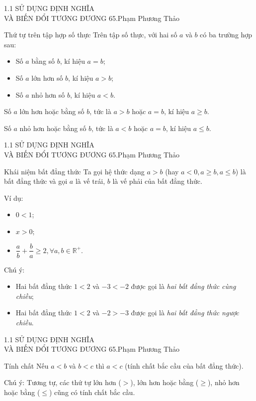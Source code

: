 \begin{frame}{
1.1 SỬ DỤNG ĐỊNH NGHĨA \\ VÀ BIẾN ĐỔI TƯƠNG ĐƯƠNG \hspace{3cm}  65.Phạm Phương Thảo} 
\begin{block}{Thứ tự trên tập hợp số thực}
\pause
Trên tập số thực, với hai số $a$ và $b$ có ba trường hợp sau:

\begin{itemize}
    \item Số $a$ bằng số $b$, kí hiệu $a=b$;
    \item Số $a$ lớn hơn số $b$, kí hiệu $a>b$;
    \item Số $a$ nhỏ hơn số $b$, kí hiệu $a<b$.
\end{itemize}
\end{block} 
\pause
Số $a$ lớn hơn hoặc bằng số $b$, tức là $a>b$ hoặc $a=b$, kí hiệu $a\geq b$.

Số $a$ nhỏ hơn hoặc bằng số $b$, tức là $a<b$ hoặc $a=b$, kí hiệu $a\leq b$.
\end{frame}

\begin{frame}{
1.1 SỬ DỤNG ĐỊNH NGHĨA \\ VÀ BIẾN ĐỔI TƯƠNG ĐƯƠNG \hspace{3cm}  65.Phạm Phương Thảo} 
\begin{block}{Khái niệm bất đẳng thức}
\pause
Ta gọi hệ thức dạng $a>b$ (hay $a<0, a\geq b, a\leq b$) là bất đẳng thức và gọi $a$ là vế trái, $b$ là vế phải của bất đẳng thức.
\end{block} 
\pause
Ví dụ: 
\begin{itemize}
    \item $0<1$;
    \item $x>0$;
    \item $\dfrac{a}{b}+\dfrac{b}{a}\geq 2, \forall a,b \in \mathbb{R}^+$.
\end{itemize}
\pause
Chú ý:
\begin{itemize}
    \item Hai bất đẳng thức $1<2$ và $-3<-2$ được gọi là \textit{hai bất đẳng thức cùng chiều};
    \item Hai bất đẳng thức $1<2$ và $-2>-3$ được gọi là \textit{hai bất đẳng thức ngược chiều}.
\end{itemize}
\end{frame} 

\begin{frame}{1.1 SỬ DỤNG ĐỊNH NGHĨA \\ VÀ BIẾN ĐỔI TƯƠNG ĐƯƠNG \hspace{3cm}  65.Phạm Phương Thảo}
\begin{block}{Tính chất}
Nếu $a<b$ và $b<c$ thì $a<c$ (tính chất bắc cầu của bất đẳng thức).
\end{block}
\pause
Chú ý:
Tương tự, các thứ tự lớn hơn ($>$), lớn hơn hoặc bằng ($\geq$), nhỏ hơn hoặc bằng ($\leq$) cũng có tính chất bắc cầu.
\end{frame}

